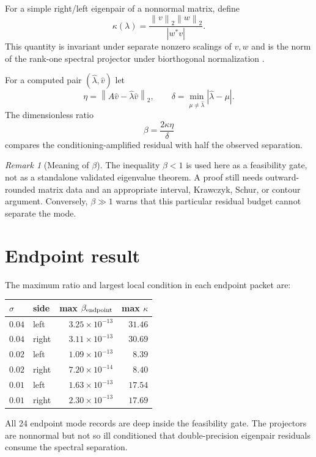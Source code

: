 \documentclass[12pt]{article}
\theoremstyle{remark}\newtheorem{remark}[theorem]{Remark}
\newcommand{\norm}[1]{\left\lVert#1\right\rVert}
\begin{document}
For a simple right/left eigenpair of a nonnormal matrix, define
\begin{equation}\label{eq:kappa}
 \kappa(\lambda)=\frac{\norm v_2\norm w_2}{|w^*v|}.
\end{equation}
This quantity is invariant under separate nonzero scalings of $v,w$ and is
the norm of the rank-one spectral projector under biorthogonal
normalization \citep{StewartSun1990,TrefethenEmbree2005}.

For a computed pair $(\widehat\lambda,\widehat v)$ let
\begin{equation}\label{eq:residual}
 \eta=\norm{A\widehat v-\widehat\lambda\widehat v}_2,
 \qquad
 \delta=\min_{\mu\ne\widehat\lambda}|\widehat\lambda-\mu|.
\end{equation}
The dimensionless ratio
\begin{equation}\label{eq:beta}
 \beta=\frac{2\kappa\eta}{\delta}
\end{equation}
compares the conditioning-amplified residual with half the observed
separation.

\begin{remark}[Meaning of $\beta$]
The inequality $\beta<1$ is used here as a feasibility gate, not as a
standalone validated eigenvalue theorem.  A proof still needs outward-rounded
matrix data and an appropriate interval, Krawczyk, Schur, or contour
argument.  Conversely, $\beta\gg1$ warns that this particular residual
budget cannot separate the mode.
\end{remark}

\section{Endpoint result}

The maximum ratio and largest local condition in each endpoint packet are:
\begin{center}
\small
\begin{tabular}{llrr}
\toprule
$\sigma$ & side & max $\beta_{\rm endpoint}$ & max $\kappa$\\
\midrule
$0.04$ & left  & $3.25\times10^{-13}$ & $31.46$\\
$0.04$ & right & $3.11\times10^{-13}$ & $30.69$\\
$0.02$ & left  & $1.09\times10^{-13}$ & $8.39$\\
$0.02$ & right & $7.20\times10^{-14}$ & $8.40$\\
$0.01$ & left  & $1.63\times10^{-13}$ & $17.54$\\
$0.01$ & right & $2.30\times10^{-13}$ & $17.69$\\
\bottomrule
\end{tabular}
\end{center}
All 24 endpoint mode records are deep inside the feasibility gate.  The
projectors are nonnormal but not so ill conditioned that double-precision
eigenpair residuals consume the spectral separation.
\end{document}
